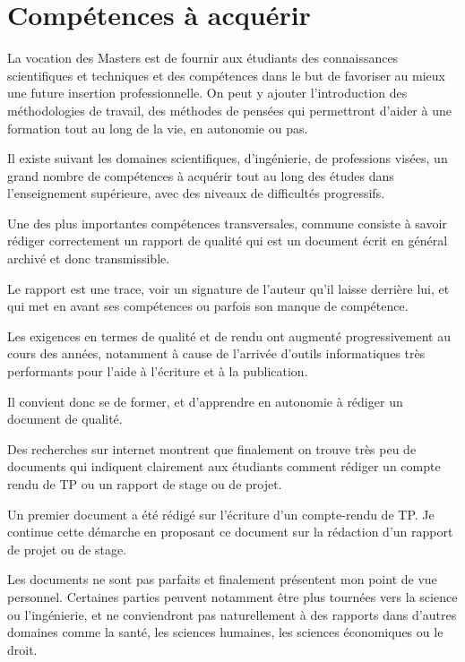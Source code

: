\section{Compétences à acquérir}

La vocation des Masters est de fournir aux étudiants des connaissances scientifiques et techniques et des compétences 
dans le but de favoriser au mieux une future insertion professionnelle.
 On peut y ajouter l'introduction des méthodologies de travail, des méthodes de pensées qui permettront d'aider à une
 formation tout au long de la vie, en autonomie ou pas. 

Il existe suivant les domaines scientifiques, d'ingénierie, de professions visées, 
 un grand nombre de compétences à acquérir tout au long des études dans l'enseignement supérieure, 
avec des niveaux  de difficultés progressifs.

Une des plus importantes  compétences transversales,  commune  consiste à 
 savoir rédiger correctement un rapport de qualité  qui est un document écrit en général archivé et donc transmissible.

Le rapport est une trace, voir un signature de l'auteur qu'il laisse derrière lui,
et qui met en avant ses compétences ou parfois son manque de compétence. 

Les exigences en termes de qualité et de rendu ont augmenté progressivement au cours des années,
 notamment à cause de l'arrivée d'outils informatiques très performants pour l'aide à l'écriture et à la publication.

Il convient donc se de former, et d'apprendre en autonomie à rédiger un document de qualité. 

Des recherches sur internet montrent que finalement on trouve très peu de documents qui indiquent clairement 
aux étudiants comment rédiger un compte rendu de TP ou un rapport de stage ou de projet. 
 

Un premier document a été rédigé  sur l'écriture d'un compte-rendu de TP.
Je continue  cette démarche en proposant ce document sur la rédaction d'un rapport de projet ou de stage.

Les documents ne sont pas parfaits et finalement présentent mon point de vue personnel.
Certaines parties peuvent notamment être plus tournées vers la science ou l'ingénierie, et ne conviendront pas naturellement 
à des rapports
dans d'autres domaines comme la santé,  les sciences humaines, les sciences économiques ou le droit.

